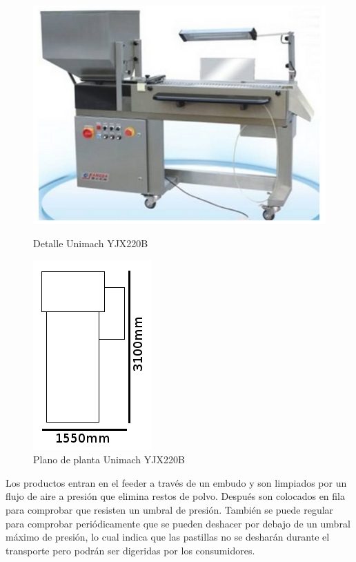 	\begin{figure}[htp]
		\begin{minipage}{.48\textwidth}
			\centering
			\includegraphics[scale=0.6]{Datasheets/3Foto.png}
			\caption{Detalle Unimach YJX220B}
			\label{fig:testa}
		\end{minipage}
		\begin{minipage}{.48\textwidth}
			\centering
			\includegraphics[scale=0.8]{Datasheets/Miniaturas/verificacion.png}
			\caption{Plano de planta Unimach YJX220B}
			\label{fig:testb}
		\end{minipage}
	\end{figure}
	

	Los productos entran en el feeder a través de un embudo y son limpiados por un flujo de aire a presión que elimina restos de polvo. Después son colocados en fila para comprobar que resisten un umbral de presión. También se puede regular para comprobar periódicamente que se pueden deshacer por debajo de un umbral máximo de presión, lo cual indica que las pastillas no se desharán durante el transporte pero podrán ser digeridas por los consumidores.\\


